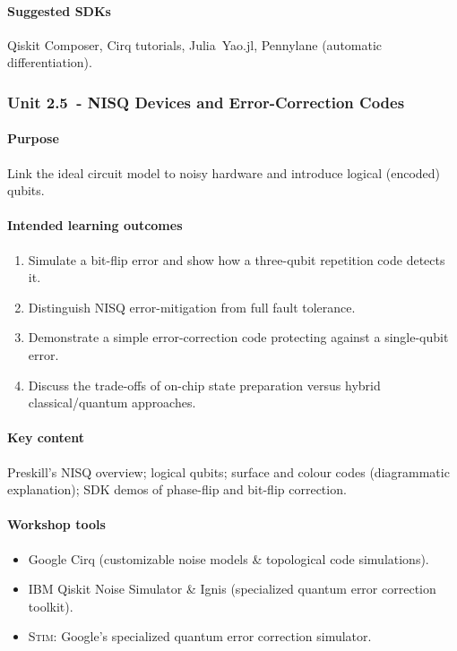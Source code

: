 \paragraph{Suggested SDKs}
Qiskit Composer, Cirq tutorials, Julia~Yao.jl, Pennylane (automatic differentiation).

\vspace{0.5em}


\subsubsection*{Unit 2.5 - NISQ Devices and Error-Correction Codes}

\paragraph{Purpose}  
Link the ideal circuit model to noisy hardware and introduce logical (encoded) qubits.

\paragraph{Intended learning outcomes}
\begin{enumerate}[label=2.5-\arabic*]
	\item Simulate a bit-flip error and show how a three-qubit repetition code detects it.  
	\item Distinguish NISQ error-mitigation from full fault tolerance.  
	\item Demonstrate a simple error-correction code protecting against a single-qubit error.  
	\item Discuss the trade-offs of on-chip state preparation versus hybrid	classical/quantum approaches.
\end{enumerate}

\paragraph{Key content}
Preskill’s NISQ overview; logical qubits; surface and colour codes (diagrammatic explanation); 
SDK demos of phase-flip and bit-flip correction.

\paragraph{Workshop tools}
\begin{itemize}
	\item Google Cirq (customizable noise models \& topological code simulations).
	\item IBM Qiskit Noise Simulator \& Ignis (specialized quantum error correction toolkit).
	\item \textsc{Stim}: Google's specialized quantum error correction simulator.
\end{itemize}


